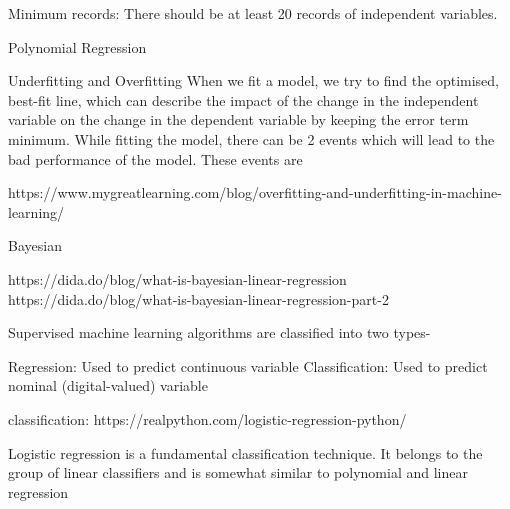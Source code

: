 Minimum records: There should be at least 20 records of independent variables.


Polynomial Regression

Underfitting and Overfitting
When we fit a model, we try to find the optimised, best-fit line, which can describe the impact of the change in the independent variable on the change in the dependent variable by keeping the error term minimum. While fitting the model, there can be 2 events which will lead to the bad performance of the model. These events are

https://www.mygreatlearning.com/blog/overfitting-and-underfitting-in-machine-learning/



Bayesian

https://dida.do/blog/what-is-bayesian-linear-regression
https://dida.do/blog/what-is-bayesian-linear-regression-part-2 

Supervised machine learning algorithms are classified into two types-

Regression: Used to predict continuous variable
Classification: Used to predict nominal (digital-valued) variable

classification:
https://realpython.com/logistic-regression-python/

Logistic regression is a fundamental classification technique. It belongs to the group of linear classifiers and is somewhat similar to polynomial and linear regression 

 
